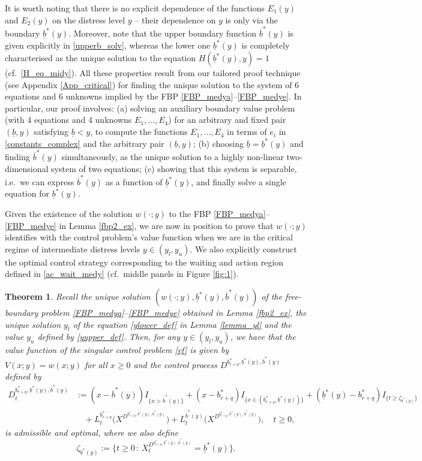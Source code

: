 \documentclass[11pt]{article} %
\newtheorem{theorem}{Theorem}
\newcommand{\ubar}[1]{\underaccent{\bar}{#1}}
\numberwithin{komcounter}{section}
\renewcommand{\ubar}{\underline}
\renewcommand{\bar}{\overline}
\numberwithin{equation}{section}
\numberwithin{theorem}{section}
\begin{document}
It is worth noting that there is no explicit dependence of the functions $E_1(y)$ and $E_2(y)$ on the distress level $y$ -- their dependence on $y$ is only via the boundary $\ubar{b}^*(y)$.
Moreover, note that the upper boundary function $\bar{b}^*(y)$ is given explicitly in \eqref{upperb_solv}, whereas the lower one $\ubar{b}^*(y)$ is completely characterised as the unique solution to the equation $H(\ubar{b}^*(y),y) = 1$ (cf.~\eqref{H_eq_midy}).
All these properties result from our tailored proof technique (see Appendix \ref{App_critical}) for finding the unique solution to the system of 6 equations and 6 unknowns implied by the FBP \eqref{FBP_medya}--\eqref{FBP_medye}. 
In particular, our proof involves: 
(a) solving an auxiliary boundary value problem (with 4 equations and 4 unknowns $E_1, \ldots, E_4$) for an arbitrary and fixed pair $(\ubar{b},y)$ satisfying $\ubar{b} < y$, to compute the functions $E_1, \ldots, E_4$ in terms of $e_i$ in \eqref{constants_complex} and the arbitrary pair $(\ubar{b},y)$; 
(b) choosing $\ubar{b} = \underline{b}^*(y)$ and finding $\bar{b}^*(y)$ simultaneously, as the unique solution to a highly non-linear two-dimensional system of two equations;
(c) showing that this system is separable, i.e.~we can express $\bar{b}^*(y)$ as a function of $\underline{b}^*(y)$, and finally solve a single equation for $\underline{b}^*(y)$.

Given the existence of the solution $w(\cdot;y)$ to the FBP \eqref{FBP_medya}--\eqref{FBP_medye} in Lemma \ref{fbp2_ex}, we are now in position to prove that $w(\cdot;y)$ identifies with the control problem's value function when we are in the critical regime of intermediate distress levels $y \in (y_l,y_u)$. 
We also explicitly construct the optimal control strategy corresponding to the waiting and action region defined in \eqref{ac_wait_medy}
(cf.~middle panels in Figure \ref{fig:1}).

\begin{theorem} \label{thm:sub}
Recall the unique solution $(w(\cdot;y), \ubar{b}^*(y), \bar{b}^*(y))$ of the free-boundary problem \eqref{FBP_medya}--\eqref{FBP_medye} obtained in Lemma \ref{fbp2_ex}, the unique solution $y_l$ of the equation \eqref{ylower_def} in Lemma \ref{lemma_yl} and the value $y_u$ defined by \eqref{yupper_def}. 
Then, for any $y\in(y_l,y_u)$, we have that the value function of the singular control problem \eqref{vf} is given by $V(x;y) = w(x;y)$ for all $x\geq 0$ and the control process $D^{b_{r+q}^*,\ubar{b}^*(y),\bar{b}^*(y)}$ defined by 
\begin{align*}
D^{b_{r+q}^*,\ubar{b}^*(y),\bar{b}^*(y)}_t 
&:= (x-\bar{b}^*(y)) I_{\{x>\bar{b}^*(y)\}} 
+ (x-b^*_{r+q}) I_{\{x \in (b^*_{r+q}, \ubar{b}^*(y))\}} + (\ubar{b}^*(y) - b_{r+q}^*) I_{\{t\geq \zeta_{\ubar{b}^*(y)}\}} \\ 
&\quad + L^{b_{r+q}^*}_t\big(X^{D^{b^*_{r+q},\ubar{b}^*(y),\bar{b}^*(y)}}\big) 
+ L^{\bar{b}^*(y)}_t\big(X^{D^{
b^*_{r+q},\ubar{b}^*(y),\bar{b}^*(y)}}\big),
\quad t \geq 0,
\end{align*}
is admissible and optimal, where we also define
$$
\zeta_{\ubar{b}^*(y)}
:= 
\big\{ t \geq 0 \,:\, X^{D^{b_{r+q}^*,\ubar{b}^*(y),\bar{b}^*(y)}}_t = \ubar{b}^*(y) \big\}.
$$
\end{theorem}
\end{document}

